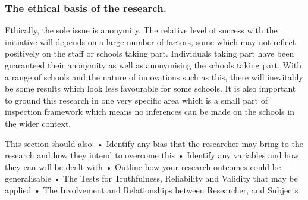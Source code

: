 \subsubsection{The ethical basis of the research.}
Ethically, the sole issue is anonymity. The relative level of success with the initiative will depends on a large number of factors, some which may not reflect positively on the staff or schools taking part. Individuals taking part have been guaranteed their anonymity as well as anonymising the schools taking part. With a range of schools and the nature of innovations such as this, there will inevitably be some results which look less favourable for some schools. It is also important to ground this research in one very specific area which is a small part of inspection framework which means no inferences can be made on the schools in the wider context.

This section should also:
•	Identify any bias that the researcher may bring to the research and how they intend to overcome this
•	Identify any variables and how they can will be dealt with
•	Outline how your research outcomes could be generalisable
•	The Tests for Truthfulness, Reliability and Validity that may be applied
•	The Involvement and Relationships between Researcher, and Subjects



